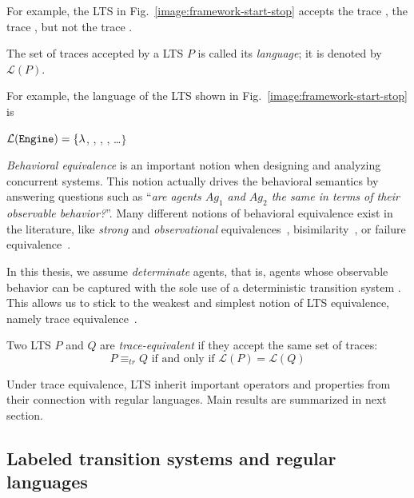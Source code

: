 For example, the LTS in Fig.~\ref{image:framework-start-stop} accepts the trace , the trace , but not the trace . 

\begin{definition}
The set of traces accepted by a LTS $P$ is called its \emph{language}; it is denoted by $\mathcal{L}(P)$.
\end{definition}

For example, the language of the LTS shown in Fig.~\ref{image:framework-start-stop} is
\begin{center}
$\mathcal{L}(\texttt{Engine})=\{\lambda$, , , , \ldots $\}$
\end{center} 

\emph{Behavioral equivalence} is an important notion when designing and analyzing concurrent systems. This notion actually drives the behavioral semantics by answering questions such as ``\emph{are agents $Ag_1$ and $Ag_2$ the same in terms of their observable behavior?}''. Many different notions of behavioral equivalence exist in the literature, like \emph{strong} and \emph{observational} equivalences~\cite{Milner:1989}, bisimilarity~\cite{Park:1981}, or failure equivalence~\cite{Hoare:1985}. 

In this thesis, we assume \emph{determinate} agents, that is, agents whose observable behavior can be captured with the sole use of a deterministic transition system \cite{Engelfriet:1985}. This allows us to stick to the weakest and simplest notion of LTS equivalence, namely trace equivalence~\cite{Hoare:1985, Engelfriet:1985}. 

\begin{definition}
Two LTS $P$ and $Q$ are \emph{trace-equivalent} if they accept the same set of traces:
\begin{equation*}
P \equiv_{tr} Q \mbox{~if and only if~} \mathcal{L}(P) = \mathcal{L}(Q)
\end{equation*}
\end{definition}

Under trace equivalence, LTS inherit important operators and properties from their connection with regular languages. Main results are summarized in next section.

\subsection{Labeled transition systems and regular languages\label{section:background-lts-and-regular-languages}}

